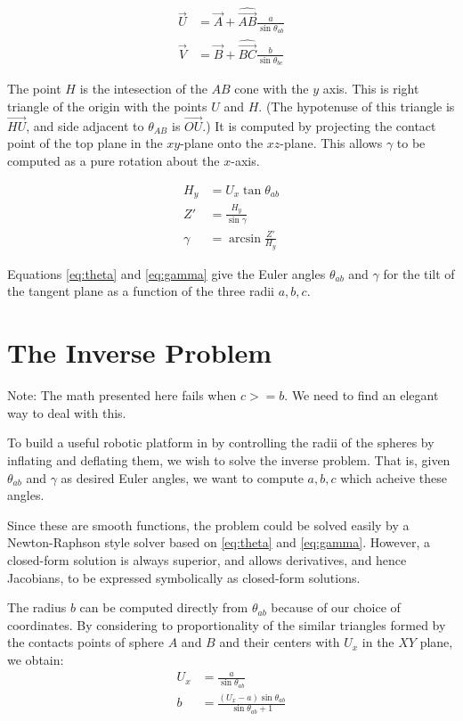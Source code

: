 \documentclass{article}
\begin{document}
\begin{align}
  \overrightarrow{U} &= \overrightarrow{A} + \hat{\overrightarrow{AB}} \frac{a}{\sin{\theta_{ab}}} \\
  \overrightarrow{V} &= \overrightarrow{B} + \hat{\overrightarrow{BC}} \frac{b}{\sin{\theta_{bc}}}
\end{align}

The point $H$ is the intesection of the $AB$ cone with the $y$ axis.
This is right triangle of the origin with the points $U$ and $H$. (The hypotenuse
of this triangle is $\overrightarrow{HU}$, and side adjacent to $\theta_{AB}$ is $\overrightarrow{OU}$.)
It is computed by projecting the contact point of the top plane in the $xy$-plane
onto the $xz$-plane. This allows $\gamma$ to be computed as a pure rotation
about the $x$-axis.

\begin{align}
  H_y &= U_x \tan{\theta_{ab}} \\
  Z' &= \frac{H_y}{\sin{\gamma}} \label{eq:zprime} \\
  \gamma &= \arcsin{\frac{Z'}{H_y}} \label{eq:gamma}
\end{align}

Equations \ref{eq:theta} and \ref{eq:gamma} give the Euler angles
$\theta_{ab}$ and $\gamma$
for the tilt of the
tangent plane as a function of the three radii $a,b,c$.


\section{The Inverse Problem}

Note: The math presented here fails when $c >= b$. We need
to find an elegant way to deal with this.

To build a useful robotic platform in by controlling the radii of the
spheres by inflating and deflating them, we wish to solve the inverse
problem. That is, given $\theta_{ab}$ and $\gamma$ as desired Euler
angles, we want to compute $a,b,c$ which acheive these angles.

Since these are smooth functions, the problem could be solved
easily by a Newton-Raphson style solver based on \ref{eq:theta} and \ref{eq:gamma}.
However, a closed-form solution is always superior, and allows derivatives,
and hence Jacobians, to be expressed symbolically as closed-form solutions.

The radius $b$ can be computed directly from $\theta_{ab}$
because of our choice of coordinates.
By considering to proportionality of the similar triangles formed
by the contacts points of sphere $A$ and $B$ and their centers with $U_x$ in the $XY$ plane,
we obtain:
\begin{align}
  U_x &= \frac{a}{\sin{\theta_{ab}}} \\
  b &= \frac{(U_x - a)\sin{\theta_{ab}}}{\sin{\theta_{ab}}+1}
\end{align}
\end{document}
